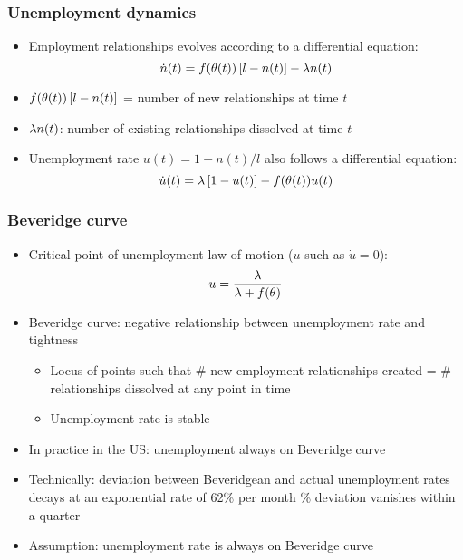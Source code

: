 \documentclass[11pt,aspectratio=169,xcolor={dvipsnames},hyperref={pdftex,pdfpagemode=UseNone,hidelinks,pdfdisplaydoctitle=true},usepdftitle=false]{beamer}
\begin{document}
\begin{frame}
\frametitle{Unemployment dynamics}
\begin{itemize}
\item Employment relationships evolves according to a differential equation:
\begin{equation*}
\dot{n}(t) = f(\theta(t)) \left[ l-n(t) \right] - \lambda  n(t)
\end{equation*}
\item $f(\theta(t)) \left[ l-n(t) \right]$ = number of new relationships at time $t$
\item $\lambda n(t)$: number of existing relationships dissolved at time $t$
\item Unemployment rate $u(t) = 1- n(t)/l$ also follows a differential equation:
\begin{equation*}
\dot{u}(t) = \lambda  \left[ 1-u(t) \right] - f(\theta(t)) u(t)
\end{equation*}
\end{itemize}	
\end{frame}

\begin{frame}
\frametitle{Beveridge curve}
\begin{itemize}
\item Critical point of unemployment law of motion ($u$ such as $\dot{u} = 0$):
\begin{equation*}
u = \frac{\lambda}{\lambda+f(\theta)}
\end{equation*}
\item Beveridge curve: negative relationship between unemployment rate and tightness
\begin{itemize}
 \item Locus of points such that \# new employment relationships created = \# relationships dissolved at any point in time
 \item Unemployment rate is stable
 \end{itemize} 
\item In practice in the US:  unemployment always on Beveridge curve
\item Technically: deviation between Beveridgean and actual unemployment rates decays at an exponential rate of 62\% per month \% deviation vanishes within a quarter
\item Assumption: unemployment rate is always on Beveridge curve
\end{itemize}	
\end{frame}
\end{document}
